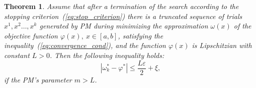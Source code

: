 \documentclass[preprint]{elsarticle}
\newtheorem{theorem}{Theorem}
\begin{document}
\begin{theorem}
  \label{thm:theorem1}
  Assume that after a termination of the search according to the stopping criterion~(\ref{eq:stop_criterion}) there is a truncated sequence of trials $x^1, x^2 \dots, x^k$ generated by PM during minimizing the approximation $\omega(x)$ of the objective function $\varphi(x),~x\in [a,b]$, satisfying the inequality~(\ref{eq:convergence_cond}), and the function $\varphi(x)$ is Lipschitzian with constant $L > 0$. Then the following inequality holds:
  \begin{equation}
    \label{eq:theorem_1_cond}
    | \omega_k^*  - \varphi^* | \leq \frac{L \varepsilon}{2} + \xi,
  \end{equation}
  if the PM's parameter $m > L$.
\end{theorem}
\end{document}
